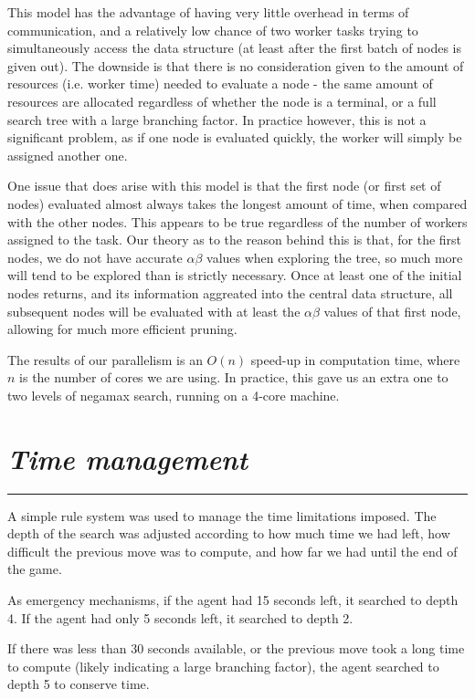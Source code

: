 \documentclass[10pt]{report}
\begin{document}
\begin{multicols}{2}
This model has the advantage of having very little overhead in terms of communication, and a relatively low chance of two worker tasks trying to simultaneously access the data structure (at least after the first batch of nodes is given out). The downside is that there is no consideration given to the amount of resources (i.e. worker time) needed to evaluate a node - the same amount of resources are allocated regardless of whether the node is a terminal, or a full search tree with a large branching factor. In practice however, this is not a significant problem, as if one node is evaluated quickly, the worker will simply be assigned another one.

One issue that does arise with this model is that the first node (or first set of nodes) evaluated almost always takes the longest amount of time, when compared with the other nodes. This appears to be true regardless of the number of workers assigned to the task. Our theory as to the reason behind this is that, for the first nodes, we do not have accurate $\alpha\beta$ values when exploring the tree, so much more will tend to be explored than is strictly necessary. Once at least one of the initial nodes returns, and its information aggreated into the central data structure, all subsequent nodes will be evaluated with at least the $\alpha\beta$ values of that first node, allowing for much more efficient pruning.

The results of our parallelism is an $O(n)$ speed-up in computation time, where $n$ is the number of cores we are using. In practice, this gave us an extra one to two levels of negamax search, running on a 4-core machine.
\section*{\emph{Time management}}
\hrule

A simple rule system was used to manage the time limitations imposed. The depth of the search was adjusted according to how much time we had left, how difficult the previous move was to compute, and how far we had until the end of the game.

As emergency mechanisms, if the agent had 15 seconds left, it searched to depth 4. If the agent had only 5 seconds left, it searched to depth 2.

If there was less than 30 seconds available, or the previous move took a long time to compute (likely indicating a large branching factor), the agent searched to depth 5 to conserve time.


\end{multicols}
\end{document}

